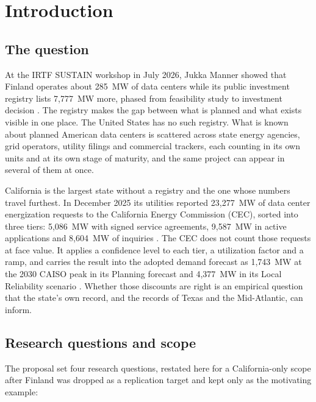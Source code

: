 \chapter{Introduction}
\label{ch:intro}

\section{The question}

At the IRTF SUSTAIN workshop in July 2026, Jukka Manner showed that Finland operates about 285~MW of data centers while its public investment registry lists 7,777~MW more, phased from feasibility study to investment decision \citep{manner2026}. The registry makes the gap between what is planned and what exists visible in one place. The United States has no such registry. What is known about planned American data centers is scattered across state energy agencies, grid operators, utility filings and commercial trackers, each counting in its own units and at its own stage of maturity, and the same project can appear in several of them at once.

California is the largest state without a registry and the one whose numbers travel furthest. In December 2025 its utilities reported 23,277~MW of data center energization requests to the California Energy Commission (CEC), sorted into three tiers: 5,086~MW with signed service agreements, 9,587~MW in active applications and 8,604~MW of inquiries \citep{cec_assembly2026,cec_dc_memo2026}. The CEC does not count those requests at face value. It applies a confidence level to each tier, a utilization factor and a ramp, and carries the result into the adopted demand forecast as 1,743~MW at the 2030 CAISO peak in its Planning forecast and 4,377~MW in its Local Reliability scenario \citep{ced2025_tables}. Whether those discounts are right is an empirical question that the state's own record, and the records of Texas and the Mid-Atlantic, can inform.

\section{Research questions and scope}

The proposal set four research questions, restated here for a California-only scope after Finland was dropped as a replication target and kept only as the motivating example:

